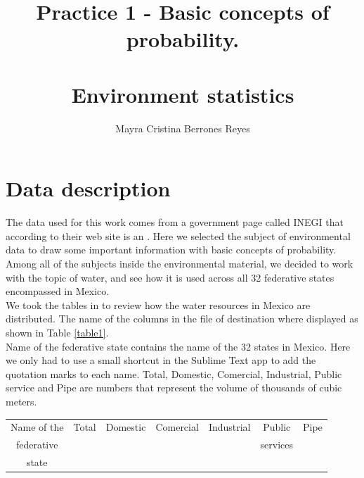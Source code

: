 \documentclass{article}
\begin{document}
\title{%
  Practice 1 - Basic concepts of probability. \\~\\
  \Large Environment statistics}
\author{Mayra Cristina Berrones Reyes}

\maketitle


\section{Data description}
The data used for this work comes from a government page called INEGI \cite{ine1} that according to their web site is an  \cite{ine1}. Here we selected the subject of environmental data to draw some important information with basic concepts of probability.\\

Among all of the subjects inside the environmental material, we decided to work with the topic of water\cite{ine3}, and see how it is used across all 32 federative states encompassed in Mexico.\\

We took the tables in \cite{ine3} to review how the water resources in Mexico are distributed. The name of the columns in the file of destination where displayed as shown in Table \ref{table1}.\\

Name of the federative state contains the name of the 32 states in Mexico. Here we only had to use a small shortcut in the Sublime Text app to add the quotation marks to each name. Total, Domestic, Comercial, Industrial, Public service and Pipe are numbers that represent the volume of thousands of cubic meters. \\

\begin{center}\label{table1}
\begin{tabular}{| c | c | c | c | c | c | c |}
\hline
Name of the  & Total & Domestic & Comercial & Industrial & Public & Pipe\\  
federative  &  	&  		&			&		& services&\\  
 state  &  	&  		&			&		& &\\  
 \hline
\end{tabular}
\end{center}
\end{document}
